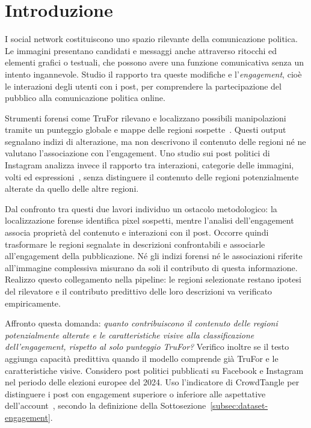 
\chapter{Introduzione}
\label{chap:introduzione}

I social network costituiscono uno spazio rilevante della comunicazione politica. Le immagini presentano candidati e messaggi anche attraverso ritocchi ed elementi grafici o testuali, che possono avere una funzione comunicativa senza un intento ingannevole. Studio il rapporto tra queste modifiche e l'\emph{engagement}, cioè le interazioni degli utenti con i post, per comprendere la partecipazione del pubblico alla comunicazione politica online.

Strumenti forensi come TruFor rilevano e localizzano possibili manipolazioni tramite un punteggio globale e mappe delle regioni sospette~\cite{Guillaro_2023_CVPR}. Questi output segnalano indizi di alterazione, ma non descrivono il contenuto delle regioni né ne valutano l'associazione con l'engagement. Uno studio sui post politici di Instagram analizza invece il rapporto tra interazioni, categorie delle immagini, volti ed espressioni~\cite{doi:10.1177/1940161220964769}, senza distinguere il contenuto delle regioni potenzialmente alterate da quello delle altre regioni.

Dal confronto tra questi due lavori individuo un ostacolo metodologico: la localizzazione forense identifica pixel sospetti, mentre l'analisi dell'engagement associa proprietà del contenuto e interazioni con il post. Occorre quindi trasformare le regioni segnalate in descrizioni confrontabili e associarle all'engagement della pubblicazione. Né gli indizi forensi né le associazioni riferite all'immagine complessiva misurano da soli il contributo di questa informazione. Realizzo questo collegamento nella pipeline: le regioni selezionate restano ipotesi del rilevatore e il contributo predittivo delle loro descrizioni va verificato empiricamente.

Affronto questa domanda: \emph{quanto contribuiscono il contenuto delle regioni potenzialmente alterate e le caratteristiche visive alla classificazione dell'engagement, rispetto al solo punteggio TruFor?} Verifico inoltre se il testo aggiunga capacità predittiva quando il modello comprende già TruFor e le caratteristiche visive. Considero post politici pubblicati su Facebook e Instagram nel periodo delle elezioni europee del 2024. Uso l'indicatore di CrowdTangle per distinguere i post con engagement superiore o inferiore alle aspettative dell'account~\cite{DVN/SCCQYD_2019}, secondo la definizione della Sottosezione~\ref{subsec:dataset-engagement}.

